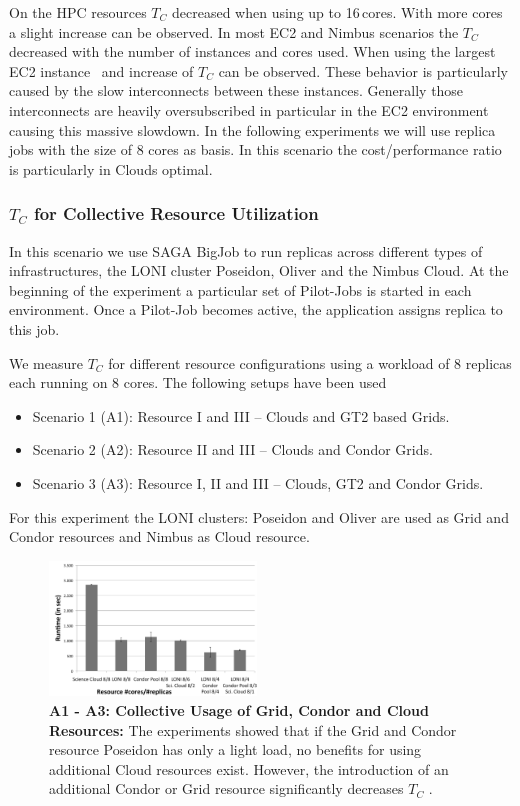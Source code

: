 \documentclass[conference,final]{IEEEtran}
\newcommand{\tc}{$T_{C}$ }
\begin{document}
On the HPC resources \tc decreased when using up to 16\,cores. With
more cores a slight increase can be observed. In most EC2 and Nimbus
scenarios the \tc decreased with the number of instances and cores
used. When using the largest EC2 instance~\cite{new-ec2} and increase
of \tc can be observed. These behavior is particularly caused by the
slow interconnects between these instances. Generally those
interconnects are heavily oversubscribed in particular in the EC2
environment causing this massive slowdown. In the following
experiments we will use replica jobs with the size of 8 cores as
basis. In this scenario the cost/performance ratio is particularly in
Clouds optimal.

\subsubsection{\tc for Collective Resource Utilization}

In this scenario we use SAGA BigJob to run replicas across
different types of infrastructures, the LONI
cluster Poseidon, Oliver and the Nimbus Cloud. 
At the beginning of the experiment a particular set of
Pilot-Jobs is started in each environment. Once a Pilot-Job becomes
active, the application assigns replica to this job. 

We measure \tc for different resource configurations using a workload
of 8 replicas each running on 8 cores. The following setups have been used
\begin{itemize}
\item Scenario 1 (A1): Resource I and III -- Clouds and GT2 based Grids. 
\item Scenario 2 (A2): Resource II and III -- Clouds and Condor Grids.
\item Scenario 3 (A3): Resource I, II and III -- Clouds, GT2 and Condor Grids.
\end{itemize} 
For this experiment the LONI clusters: Poseidon and Oliver are used as Grid and Condor resources and
Nimbus as Cloud resource.

\begin{figure}[htbp]
    \centering
        \includegraphics[width=0.49\textwidth]{performance/8replica_scenario_grid_condor_cloud}
        \caption{\textbf{A1 - A3: Collective Usage of Grid, Condor and
            Cloud Resources: } The experiments showed that if the Grid
          and Condor resource Poseidon has only a light load, no
          benefits for using additional Cloud resources
          exist. However, the introduction of an additional Condor
          or Grid resource significantly decreases \tc.}
    \label{fig:performance_8replica_grid_cloud_condor}
\end{figure}
\end{document}
